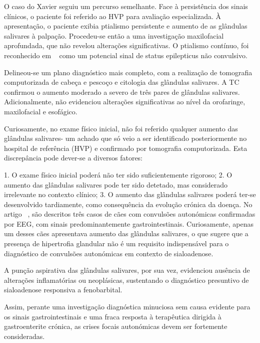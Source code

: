 O caso do Xavier seguiu um percurso semelhante. Face à persistência dos sinais clínicos, o paciente foi referido ao HVP para avaliação especializada. À apresentação, o paciente exibia ptialismo persistente e aumento de as glândulas salivares à palpação. Procedeu-se então a uma investigação maxilofacial aprofundada, que não revelou alterações significativas.  O ptialismo contínuo, foi reconhecido em ~\cite{Diop2025} como um potencial sinal de status epilepticus não convulsivo.


 Delineou-se um plano diagnóstico mais completo, com a realização de tomografia computorizada de cabeça e pescoço e citologia das glândulas salivares. A TC confirmou o aumento moderado a severo de três pares de glândulas salivares.  Adicionalmente, não evidenciou alterações significativas ao nível da orofaringe, maxilofacial e esofágico.


Curiosamente, no exame físico inicial, não foi referido qualquer aumento das glândulas salivares- um achado que só veio a ser identificado posteriormente no hospital de referência (HVP) e confirmado por tomografia computorizada. Esta discrepância pode dever-se a diversos fatores: 


1.	O exame físico inicial poderá não ter sido suficientemente rigoroso; 
2.	O aumento das glândulas salivares pode ter sido detetado, mas considerado irrelevante no contexto clínico;
3.	O aumento das glândulas salivares poderá ter-se desenvolvido tardiamente, como consequência da evolução crónica da doença. No artigo ~\cite{Diop2025}, são descritos três casos de cães com convulsões autonómicas confirmadas por EEG, com sinais predominantemente gastrointestinais. Curiosamente, apenas um desses cães apresentava aumento das glândulas salivares, o que sugere que a presença de hipertrofia glandular não é um requisito indispensável para o diagnóstico de convulsões autonómicas em contexto de sialoadenose.


A punção aspirativa das glândulas salivares, por sua vez, evidenciou ausência de alterações inflamatórias ou neoplásicas, sustentando o diagnóstico presuntivo de sialoadenose responsiva a fenobarbital. 


Assim, perante uma investigação diagnóstica minuciosa sem causa evidente para os sinais gastrointestinais e uma fraca resposta à terapêutica dirigida à gastroenterite crónica, as crises focais autonómicas devem ser fortemente consideradas. ~\cite{Diop2025}


